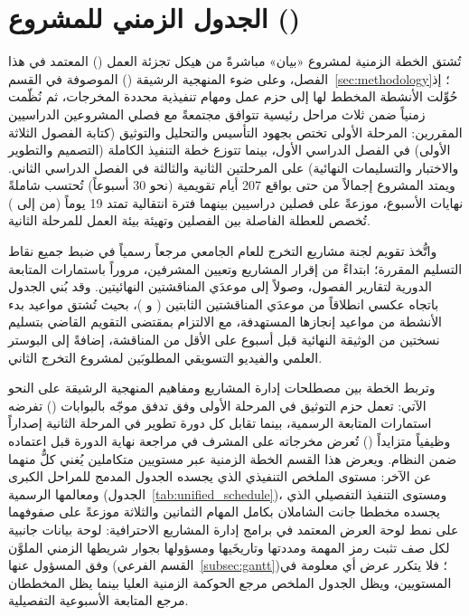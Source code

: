\section{الجدول الزمني للمشروع ()}
\label{sec:schedule}

تُشتق الخطة الزمنية لمشروع «بيان» مباشرةً من هيكل تجزئة العمل
() المعتمد في هذا الفصل، وعلى ضوء المنهجية
الرشيقة () الموصوفة في القسم~\ref{sec:methodology}؛ إذ حُوِّلت
الأنشطة المخطط لها إلى حزم عمل ومهام تنفيذية محددة المخرجات، ثم نُظّمت
زمنياً ضمن ثلاث مراحل رئيسية تتوافق مجتمعةً مع فصلي المشروعين الدراسيين
المقررين: المرحلة الأولى تختص بجهود التأسيس والتحليل والتوثيق (كتابة
الفصول الثلاثة الأولى) في الفصل الدراسي الأول، بينما تتوزع خطة التنفيذ
الكاملة (التصميم والتطوير والاختبار والتسليمات النهائية) على المرحلتين
الثانية والثالثة في الفصل الدراسي الثاني. ويمتد المشروع إجمالاً من 
حتى  بواقع 207 أيام تقويمية (نحو 30 أسبوعاً) تُحتسب
شاملةً نهايات الأسبوع، موزعةً على فصلين دراسيين بينهما فترة انتقالية تمتد
19 يوماً (من  إلى ) تُخصص للعطلة الفاصلة
بين الفصلين وتهيئة بيئة العمل للمرحلة الثانية.

واتُّخذ تقويم لجنة مشاريع التخرج للعام الجامعي  مرجعاً
رسمياً في ضبط جميع نقاط التسليم المقررة؛ ابتداءً من إقرار المشاريع
وتعيين المشرفين، مروراً باستمارات المتابعة الدورية لتقارير الفصول، وصولاً
إلى موعدَي المناقشتين النهائيتين. وقد بُني الجدول باتجاه
عكسي انطلاقاً من موعدَي المناقشتين الثابتين ( و
)، بحيث تُشتق مواعيد بدء الأنشطة من مواعيد إنجازها
المستهدفة، مع الالتزام بمقتضى التقويم القاضي بتسليم نسختين من الوثيقة
النهائية قبل أسبوع على الأقل من المناقشة، إضافةً إلى البوستر العلمي
والفيديو التسويقي المطلوبَين لمشروع التخرج الثاني.

وتربط الخطة بين مصطلحات إدارة المشاريع ومفاهيم المنهجية الرشيقة على
النحو الآتي: تعمل حزم التوثيق في المرحلة الأولى وفق تدفق موجّه بالبوابات
() تفرضه استمارات المتابعة الرسمية، بينما تقابل كل دورة
تطوير في المرحلة الثانية إصداراً وظيفياً متزايداً () تُعرض
مخرجاته على المشرف في مراجعة نهاية الدورة قبل اعتماده ضمن النظام. ويعرض
هذا القسم الخطة الزمنية عبر مستويين متكاملين يُغني كلٌّ منهما عن الآخر:
مستوى الملخص التنفيذي الذي يجسده الجدول المدمج للمراحل الكبرى
ومعالمها الرسمية (الجدول~\ref{tab:unified_schedule})،
ومستوى التنفيذ التفصيلي الذي يجسده مخططا جانت الشاملان بكامل المهام
الثمانين والثلاثة موزعةً على صفوفهما على نمط لوحة العرض المعتمد في برامج
إدارة المشاريع الاحترافية: لوحة بيانات جانبية لكل صف تثبت رمز المهمة
ومددتها وتاريخَيها ومسؤولها بجوار شريطها الزمني الملوَّن وفق المسؤول عنها
(القسم الفرعي~\ref{subsec:gantt})؛ فلا يتكرر عرض أي
معلومة في المستويين، ويظل الجدول الملخص مرجع الحوكمة الزمنية العليا
بينما يظل المخططان مرجع المتابعة الأسبوعية التفصيلية.


